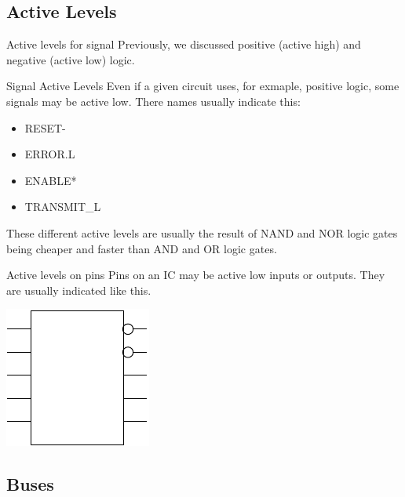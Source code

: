 \subsection{Active Levels}

\begin{frame}{Active levels for signal}
  Previously, we discussed positive (active high) and negative (active low) logic.
  \begin{block}{Signal Active Levels}
    Even if a given circuit uses, for exmaple, positive logic, some signals may be \alert{active low}.  There names usually indicate this:
    \begin{itemize}
      \item RESET-
      \item ERROR.L
      \item ENABLE*
      \item TRANSMIT\_L
    \end{itemize}
  \end{block}
\end{frame}

These different active levels are usually the result of NAND and NOR logic gates being cheaper and faster than AND and OR logic gates.

\begin{frame}{Active levels on pins}
  Pins on an IC may be active low inputs or outputs.  They are usually indicated like this.\\
  \begin{center}
    \includegraphics{ActiveLowIC}
  \end{center}
\end{frame}

\subsection{Buses}

